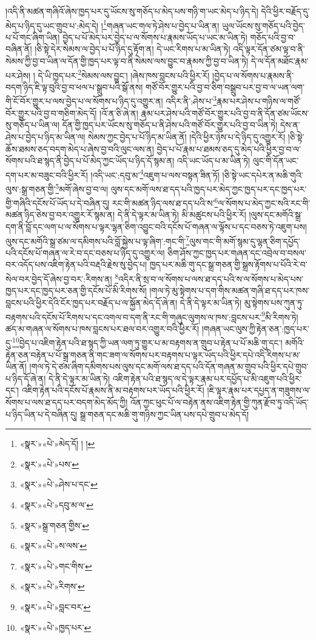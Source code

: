 །འདི་ནི་མཚན་གཞིའོ་ཞེས་ཁྱད་པར་དུ་ཡོངས་སུ་གཅོད་པ་མེད་པས་གཉི་ག་ཡང་མེད་པ་ཉིད་དེ། དེའི་ཕྱིར་བརྗོད་དུ་མེད་པ་ཉིད་དུ་ཡང་གྲུབ་པ་:མེད་དེ། །\footnote{«སྣར་»«པེ་»མེད་དོ། ། །}གཞན་ཡང་གལ་ཏེ་ཤེས་པ་བྱེད་པ་ཡིན་ན། ཡུལ་ཡོངས་སུ་གཅོད་པའི་བྱེད་པ་པོ་གང་ཞིག་ཡིན། བྱེད་པ་པོ་མེད་པར་བྱེད་པ་ལ་སོགས་པ་རྣམས་ཡོད་པ་ཡང་མ་ཡིན་ཏེ། གཅོད་པའི་བྱ་བ་བཞིན་ནོ། །ཅི་སྟེ་དེར་སེམས་ལ་བྱེད་པ་པོ་ཉིད་དུ་རྟོག་ན། དེ་ཡང་རིགས་པ་མ་ཡིན་ཏེ། འདི་ལྟར་དོན་ཙམ་ལྟ་བ་ནི་སེམས་ཀྱི་བྱ་བ་ཡིན་ལ་དོན་གྱི་ཁྱད་པར་ལྟ་བ་ནི་སེམས་ལས་བྱུང་བ་རྣམས་ཀྱི་བྱ་བ་ཡིན་ཏེ། དེ་ལ་དོན་མཐོང་རྣམ་པར་ཤེས། །
དེ་ཡི་ཁྱད་པར་\footnote{«སྣར་»«པེ་»པས་}སེམས་ལས་བྱུང་། །ཞེས་ཁས་བླངས་པའི་ཕྱིར་རོ། །བྱེད་པ་ལ་སོགས་པ་རྣམས་ནི་བདག་ཉིད་ཇི་ལྟ་བུའི་བྱ་བ་ཕལ་པ་སྒྲུབ་པའི་སྒོ་ནས། གཙོ་བོར་གྱུར་པའི་བྱ་བ་ཅིག་བསྒྲུབ་པར་བྱ་བ་ལ་ཡན་ལག་གི་ངོ་བོར་གྱུར་པ་ལས་བྱེད་པ་ལ་སོགས་པ་ཉིད་དུ་འགྱུར་ན། འདིར་ནི་:ཤེས་པ་\footnote{«སྣར་»«པེ་»ཤེས་པ་དང་}རྣམ་པར་ཤེས་པ་གཉིས་ལ་གཙོ་བོར་གྱུར་པའི་བྱ་བ་གཅིག་མེད་དོ། །འོ་ན་ཅི་ཞེ་ན། རྣམ་པར་ཤེས་པའི་གཙོ་བོར་གྱུར་པའི་བྱ་བ་ནི་དོན་ཙམ་ཡོངས་སུ་གཅོད་པ་ཡིན་ལ། དོན་གྱི་ཁྱད་པར་ཡོངས་སུ་གཅོད་པ་ནི་ཤེས་པའི་གཙོ་བོར་གྱུར་པའི་བྱ་བ་ཡིན་ཏེ། དེས་ན་ཤེས་པ་བྱེད་པ་ཉིད་མ་ཡིན་ལ། སེམས་ཀྱང་བྱེད་པ་པོ་ཉིད་མ་ཡིན་ནོ། །དེའི་ཕྱིར་ཉེས་པ་དེ་ཉིད་དུ་འགྱུར་རོ། །ཅི་སྟེ་ཆོས་ཐམས་ཅད་བདག་མེད་པ་ཞེས་བྱ་བའི་ལུང་ལས་ན། བྱེད་པ་པོ་རྣམ་པ་ཐམས་ཅད་དུ་མེད་པའི་ཕྱིར་བྱ་བ་ལ་སོགས་པའི་ཐ་སྙད་ནི་བྱེད་པ་པོ་མེད་ཀྱང་ཡོད་པ་ཉིད་དོ་སྙམ་ན། འདི་ཡང་ཡོད་པ་མ་ཡིན་ཏེ། ལུང་གི་དོན་ཡང་དག་པར་མ་བཟུང་བའི་ཕྱིར་རོ། །འདི་ཡང་:དབུ་མ་\footnote{«སྣར་»«པེ་»དབུ་མ་ལ་}འཇུག་པ་ལས་བསྟན་ཟིན་ཏོ། །ཅི་སྟེ་ཡང་དཔེར་ན་མཆི་གུའི་ལུས་:སྒྲ་གཅན་གྱི་\footnote{«སྣར་»སྒྲ་གཅན་གྱིས་}མགོ་ཞེས་བྱ་བ་ལ། ལུས་དང་མགོ་ལས་ཐ་དད་པའི་ཁྱད་པར་མེད་ཀྱང་ཁྱད་པར་དང་ཁྱད་པར་གྱི་གཞིའི་དངོས་པོ་ཡོད་པ་དེ་བཞིན་དུ། རང་གི་མཚན་ཉིད་ལས་ཐ་དད་པའི་ས་\footnote{«སྣར་»«པེ་»ས་ལས་}ལ་སོགས་པ་མེད་ཀྱང་སའི་རང་གི་མཚན་ཉིད་ཅེས་བྱ་བར་འགྱུར་རོ་སྙམ་ན། དེ་ནི་དེ་ལྟར་མ་ཡིན་ཏེ། མི་མཚུངས་པའི་ཕྱིར་རོ། །ལུས་དང་མགོའི་སྒྲ་དག་ནི་བློ་དང་ལག་པ་ལ་སོགས་པ་ལྟར་ལྷན་ཅིག་འབྱུང་བའི་དངོས་པོ་གཞན་ལ་ལྟོས་པ་དང་བཅས་ཏེ་འཇུག་པས། ལུས་དང་མགོའི་སྒྲ་ཙམ་ལ་དམིགས་པའི་བློ་སྐྱེས་པ་ལྟ་ཞིག་:གང་གི་\footnote{«སྣར་»«པེ་»གང་གིས་}ལུས་གང་གི་མགོ་སྙམ་དུ་ལྷན་ཅིག་དཔྱོད་པའི་དངོས་པོ་གཞན་ལ་རེ་བ་དང་བཅས་པ་ཉིད་དུ་འགྱུར་ལ། ཅིག་ཤོས་ཀྱང་ཁྱད་པར་གཞན་དང་འབྲེལ་བ་བསལ་བར་འདོད་པས་འཇིག་རྟེན་པའི་བརྡའི་རྗེས་སུ་བྱེད་པ། ཁྱད་པར་མཆི་གུ་དང་སྒྲ་གཅན་གྱི་སྒྲས་རྟོགས་པ་པོའི་རེ་བ་སེལ་བར་བྱེད་དོ་ཞེས་བྱ་བར་:རིགས་ན། \footnote{«སྣར་»«པེ་»རིགས་}འདིར་ནི་སྲ་བ་ལ་སོགས་པ་ལས་ཐ་དད་པའི་ས་ལ་སོགས་པ་མེད་པས་ཁྱད་པར་དང་ཁྱད་པར་ཅན་གྱི་དངོས་པོ་མི་རིགས་སོ། །གལ་ཏེ་མུ་སྟེགས་པ་དག་གིས་མཚན་གཞི་ཐ་དད་པར་ཁས་བླངས་པའི་ཕྱིར་དེའི་ངོར་ཁྱད་པར་བརྗོད་པ་ལ་སྐྱོན་མེད་དོ་ཞེ་ན། དེ་ནི་དེ་ལྟར་མ་ཡིན་ཏེ། མུ་སྟེགས་པས་ཀུན་ཏུ་བརྟགས་པའི་དངོས་པོ་རིགས་པ་དང་འགལ་བ་དག་ནི་རང་གི་གཞུང་ལུགས་ལ་ཁས་:བླངས་པར་\footnote{«སྣར་»«པེ་»བླང་བར་}མི་རིགས་ཏེ། ཚད་མ་གཞན་ལ་སོགས་པ་ཁས་བླངས་པར་ཐལ་བར་འགྱུར་བའི་ཕྱིར་རོ། །གཞན་ཡང་ལུས་ཀྱི་རྟེན་ཅན་:ཁྱད་པར་དུ་\footnote{«སྣར་»«པེ་»ཁྱད་པར་}བྱེད་པ་འཇིག་རྟེན་པའི་ཐ་སྙད་ཀྱི་ཡན་ལག་ཏུ་གྱུར་པ་མ་བརྟགས་ན་གྲུབ་པ་རྟེན་པ་པོ་མཆི་གུ་དང་། མགོའི་རྟེན་ཅན་བརྟེན་པ་པོ་སྒྲ་གཅན་ནི་གང་ཟག་ལ་སོགས་པར་བརྟགས་པ་ལྟར་ཡོད་པའི་ཕྱིར་དཔེ་འདི་རིགས་པ་མ་ཡིན་ནོ། །གལ་ཏེ་དེ་ཙམ་ཞིག་དམིགས་པས་ལུས་དང་མགོ་ལས་ཐ་དད་པའི་དོན་གཞན་མ་གྲུབ་པའི་ཕྱིར་དཔེ་གྲུབ་པ་ཉིད་དོ་ཞེ་ན། དེ་ནི་དེ་ལྟར་མ་ཡིན་ཏེ། འཇིག་རྟེན་པའི་ཐ་སྙད་ལ་དེ་ལྟར་རྣམ་པར་དཔྱོད་པ་མི་འཇུག་པའི་ཕྱིར་དང་། འཇིག་རྟེན་པའི་དངོས་པོ་རྣམས་ནི་མ་བརྟགས་པར་ཡོད་པའི་ཕྱིར་རོ། །ཇི་ལྟར་རྣམ་པར་དཔྱད་ན་གཟུགས་ལ་སོགས་པ་ལས་ཐ་དད་པར་བདག་མེད་མོད་ཀྱི། འོན་ཀྱང་ཕུང་པོ་ལ་བརྟེན་ནས་འཇིག་རྟེན་གྱི་ཀུན་རྫོབ་ཏུ་འདི་ཡོད་པ་ཉིད་ཡིན་པ་དེ་བཞིན་དུ། སྒྲ་གཅན་དང་མཆི་གུ་གཉིས་ཀྱང་ཡིན་པས་དཔེ་གྲུབ་པ་མེད་དོ། 